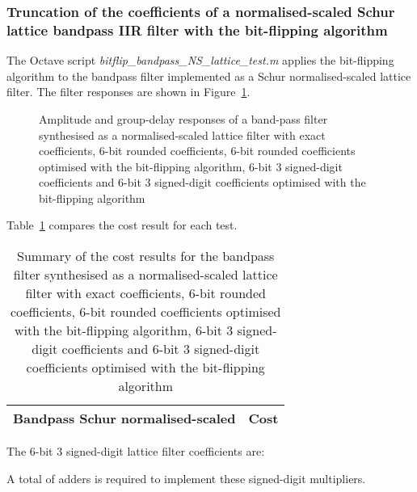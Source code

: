 \documentclass[a4paper,twoside,10pt,english]{report}
\begin{document}
\subsubsection{Truncation of the coefficients of a normalised-scaled Schur lattice bandpass IIR filter with the bit-flipping algorithm}
The Octave script \emph{bitflip\_bandpass\_NS\_lattice\_test.m} applies the
bit-flipping algorithm to the bandpass filter implemented as a Schur
normalised-scaled lattice filter. The filter responses are shown in 
Figure~\ref{fig:bitflip-bandpass-NS-lattice-response}.
\begin{figure}[!hb]
\begin{center}
\scalebox{0.7}{}
\caption{Amplitude and group-delay responses of a band-pass filter synthesised
as a normalised-scaled lattice filter with exact coefficients,
6-bit rounded coefficients, 6-bit rounded coefficients optimised 
with the bit-flipping algorithm, 6-bit 3 signed-digit coefficients and 6-bit 
3 signed-digit coefficients optimised with the bit-flipping algorithm}
\label{fig:bitflip-bandpass-NS-lattice-response}
\end{center}
\end{figure}

Table~\ref{tab:bitflip-bandpass-NS-lattice-cost-summary} compares the cost
result for each test. 
\begin{table}[htb]
\centering
\begin{threeparttable}
\begin{tabular}{lr}  \\ \toprule
Bandpass Schur normalised-scaled & Cost \\ \midrule

\bottomrule
\end{tabular}
\end{threeparttable}
\caption[Summary of cost results for the normalised-scaled bandpass
filter bit-flipping algorithm example]{Summary of the cost results for the
bandpass filter synthesised as a normalised-scaled lattice filter with exact 
coefficients, 6-bit rounded coefficients, 6-bit rounded coefficients 
optimised with the bit-flipping algorithm, 6-bit 3 signed-digit coefficients
and 6-bit 3 signed-digit coefficients optimised with the bit-flipping algorithm}
\label{tab:bitflip-bandpass-NS-lattice-cost-summary}
\end{table}

The 6-bit 3 signed-digit lattice filter coefficients are:
\begin{small}






A total of adders is
required to implement these signed-digit multipliers.
\end{small}
\end{document}
